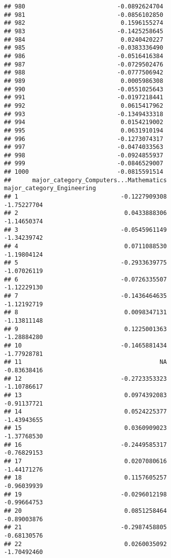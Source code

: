 \documentclass[
]{article}
\begin{document}
\begin{verbatim}
## 980                          -0.0892624704
## 981                          -0.0856102850
## 982                           0.1596155274
## 983                          -0.1425258645
## 984                           0.0240420227
## 985                          -0.0383336490
## 986                          -0.0516416384
## 987                          -0.0729502476
## 988                          -0.0777506942
## 989                           0.0005986308
## 990                          -0.0551025643
## 991                          -0.0197218441
## 992                           0.0615417962
## 993                          -0.1349433318
## 994                           0.0154219002
## 995                           0.0631910194
## 996                          -0.1273074317
## 997                          -0.0474033563
## 998                          -0.0924855937
## 999                          -0.0846529007
## 1000                         -0.0815591514
##      major_category_Computers...Mathematics major_category_Engineering
## 1                             -0.1227909308                -1.75227704
## 2                              0.0433888306                -1.14650374
## 3                             -0.0545961149                -1.34239742
## 4                              0.0711088530                -1.19804124
## 5                             -0.2933639775                -1.07026119
## 6                             -0.0726335507                -1.12229130
## 7                             -0.1436464635                -1.12192719
## 8                              0.0098347131                -1.13811148
## 9                              0.1225001363                -1.28884280
## 10                            -0.1465881434                -1.77928781
## 11                                       NA                -0.83638416
## 12                            -0.2723353323                -1.10786617
## 13                             0.0974392083                -0.91137721
## 14                             0.0524225377                -1.43943655
## 15                             0.0360909023                -1.37768530
## 16                            -0.2449585317                -0.76829153
## 17                             0.0207080616                -1.44171276
## 18                             0.1157605257                -0.96039939
## 19                            -0.0296012198                -0.99664753
## 20                             0.0851258464                -0.89003876
## 21                            -0.2987458805                -0.68130576
## 22                             0.0260035092                -1.70492460

\end{verbatim}
\end{document}
